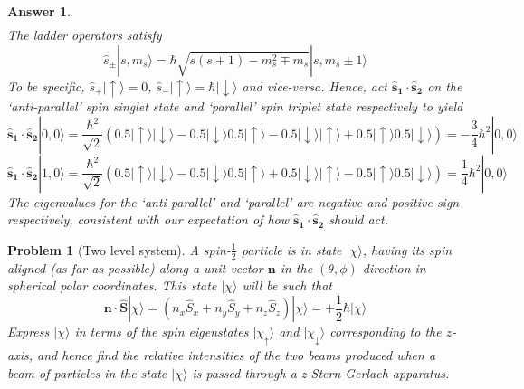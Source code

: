 \documentclass[a4paper]{article}
\newtheorem{ans}{Answer}[section]
\theoremstyle{new}
\newtheorem{qns}{Problem}[section]
\begin{document}
\begin{ans}
\begin{eqnarray}
\end{eqnarray}
The ladder operators satisfy
$$\hat{s}_\pm|s,m_s\rangle=\hbar\sqrt{s(s+1)-m_s^2\mp m_s}|s,m_s\pm1\rangle$$
To be specific, $\hat{s}_+|\uparrow\rangle=0$, $\hat{s}_-|\uparrow\rangle=\hbar|\downarrow\rangle$ and vice-versa. Hence, act $\mathbf{\hat{s}_1}\cdot\mathbf{\hat{s}_2}$ on the `anti-parallel' spin singlet state and `parallel' spin triplet state respectively to yield
$$\mathbf{\hat{s}_1}\cdot\mathbf{\hat{s}_2}|0,0\rangle=\frac{\hbar^2}{\sqrt{2}}(0.5|\uparrow\rangle|\downarrow\rangle-0.5|\downarrow\rangle0.5|\uparrow\rangle-0.5|\downarrow\rangle|\uparrow\rangle+0.5|\uparrow\rangle0.5|\downarrow\rangle)=-\frac{3}{4}\hbar^2|0,0\rangle$$
$$\mathbf{\hat{s}_1}\cdot\mathbf{\hat{s}_2}|1,0\rangle=\frac{\hbar^2}{\sqrt{2}}(0.5|\uparrow\rangle|\downarrow\rangle-0.5|\downarrow\rangle0.5|\uparrow\rangle+0.5|\downarrow\rangle|\uparrow\rangle-0.5|\uparrow\rangle0.5|\downarrow\rangle)=\frac{1}{4}\hbar^2|0,0\rangle$$
The eigenvalues for the `anti-parallel' and `parallel' are negative and positive sign respectively, consistent with our expectation of how $\mathbf{\hat{s}_1}\cdot\mathbf{\hat{s}_2}$ should act.
\end{ans}
\newpage
\begin{qns}[Two level system]
A spin-$\frac{1}{2}$ particle is in state $|\chi\rangle$, having its spin aligned (as far as possible) along a unit vector $\mathbf{n}$ in the $(\theta,\phi)$ direction in spherical polar coordinates. This state $|\chi\rangle$ will be such that
$$\mathbf{n}\cdot\mathbf{\hat{S}}|\chi\rangle=(n_x\hat{S}_x+n_y\hat{S}_y+n_z\hat{S}_z)|\chi\rangle=+\frac{1}{2}\hbar|\chi\rangle$$
Express $|\chi\rangle$ in terms of the spin eigenstates $|\chi_\uparrow\rangle$ and $|\chi_\downarrow\rangle$ corresponding to the $z$-axis, and hence find the relative intensities of the two beams produced when a beam of particles in the state $|\chi\rangle$ is passed through a z-Stern-Gerlach apparatus.
\end{qns}
\end{document}
